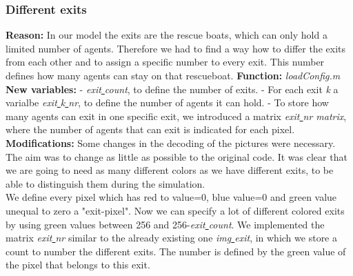 \documentclass[11pt]{article}
\begin{document}
\subsubsection{Different exits}
\textbf{Reason:}
\newline
In our model the exits are the rescue boats, which can only hold a limited number of agents. Therefore we had to find a way how to differ the exits from each other and to assign a specific number to every exit. This number defines how many agents can stay on that rescueboat.
\newline
\textbf{Function:}
\newline
\textit{loadConfig.m}
\newline
\textbf{New variables:}
\newline
- \textit{exit\underline{ }count}, to define the number of exits.\newline
- For each exit \textit{k} a varialbe \textit{exit\underline{ }k\underline{ }nr}, to define the number of agents it can hold.\newline
- To store how many agents can exit in one specific exit, we introduced a matrix \textit{exit\underline{ }nr matrix}, where the number of agents that can exit is indicated for each pixel.
\newline
\textbf{Modifications:}
\newline 
Some changes in the decoding of the pictures were necessary. The aim was to change as little as possible to the original code. It was clear that we are going to need as many different colors as we have different exits, to be able to distinguish them during the simulation.
\\
We define every pixel which has red to value=0, blue value=0 and green value unequal to zero a "exit-pixel". Now we can specify a lot of different colored exits by using green values between 256 and 256-\textit{exit\underline{ }count}.
\newline
We implemented the matrix \textit{exit\underline{ }nr} similar to the already existing one \textit{img\underline{ }exit}, in which we store a count to number the different exits. The number is defined by the green value of the pixel that belongs to this exit.

\end{document}
